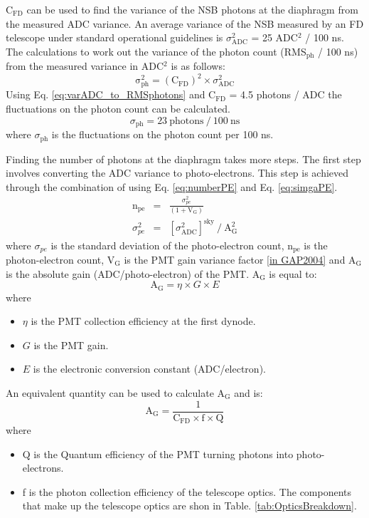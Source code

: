 C$_{\mathrm{FD}}$ can be used to find the variance of the NSB photons at the diaphragm from the measured ADC variance. An average variance of the NSB measured by an FD telescope under standard operational guidelines is $\sigma^2_{\mathrm{ADC}}$ = 25 ADC$^2$ / 100 ns. The calculations to work out the variance of the photon count (RMS$_{\mathrm{ph}}$ / 100 ns) from the measured variance in ADC$^2$ is as follows:
\begin{equation}
\mathrm{\sigma}^2_{\mathrm{ph}} = (\mathrm{C}_{\mathrm{FD}})^2 \times \sigma^2_{\mathrm{ADC}} \label{eq:varADC_to_RMSphotons}
\end{equation}
Using Eq. \ref{eq:varADC_to_RMSphotons} and C$_{\mathrm{FD}}$ = 4.5 photons / ADC the fluctuations on the photon count can be calculated.
\begin{equation}
\sigma_{\mathrm{ph}} = 23 \ \mathrm{photons} \ / \ 100 \ \mathrm{ns} \nonumber
\end{equation}
where $\sigma_{\mathrm{ph}}$ is the fluctuations on the photon count per 100 ns.

Finding the number of photons at the diaphragm takes more steps. The first step involves converting the ADC variance to photo-electrons. This step is achieved through the combination of using Eq. \ref{eq:numberPE} and Eq. \ref{eq:simgaPE}.
\begin{eqnarray}
\mathrm{n}_{\mathrm{pe}} &=& \frac{\sigma^2_{pe}}{(1 + \mathrm{V}_{\mathrm{G}})} \label{eq:numberPE} \\
\sigma^2_{pe} &=& [\sigma^2_{\mathrm{ADC}}]^{\mathrm{sky}} \ / \ \mathrm{A}^2_{\mathrm{G}} \label{eq:simgaPE}
\end{eqnarray}
where $\sigma_{pe}$ is the standard deviation of the photo-electron count, n$_{\mathrm{pe}}$ is the photon-electron count, V$_{\mathrm{G}}$ is the PMT gain variance factor \ref{in GAP2004} and A$_{\mathrm{G}}$ is the absolute gain (ADC/photo-electron) of the PMT. A$_{\mathrm{G}}$ is equal to:
\begin{equation}\label{eq:abs_gain}
\mathrm{A}_{\mathrm{G}} = \eta \times G \times E 
\end{equation}
where
\begin{itemize}
\item[] $\eta$ is the PMT collection efficiency at the first dynode.
\item[] $G$ is the PMT gain.
\item[] $E$ is the electronic conversion constant (ADC/electron).
\end{itemize}
An equivalent quantity can be used to calculate $\mathrm{A}_{\mathrm{G}}$ and is:
\begin{equation}\label{eq:abs_gain_alt}
\mathrm{A}_{\mathrm{G}} = \frac{1}{\mathrm{C}_{\mathrm{FD}}\times \mathrm{f} \times \mathrm{Q}}
\end{equation}
where
\begin{itemize}
\item[] Q is the Quantum efficiency of the PMT turning photons into photo-electrons.
\item[] f is the photon collection efficiency of the telescope optics. The components that make up the telescope optics are shon in Table. \ref{tab:OpticsBreakdown}.
\end{itemize}

